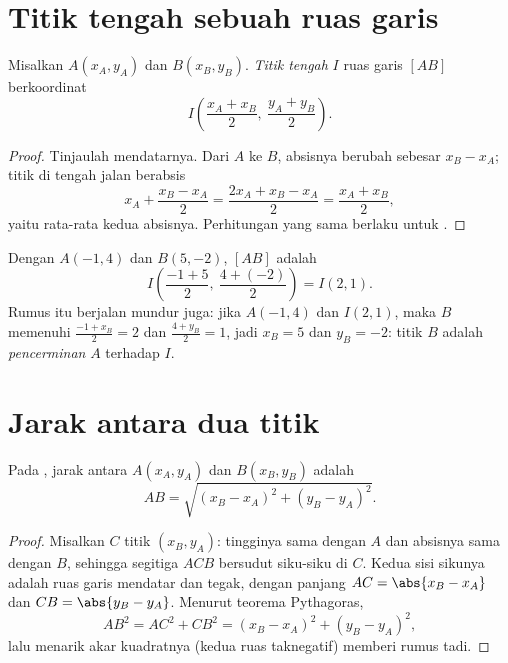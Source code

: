 \section{Titik tengah sebuah ruas garis}

\begin{proposition}\label{prop:g10:coordgeom:midpoint}
Misalkan $A(x_A, y_A)$ dan $B(x_B, y_B)$. \emph{Titik tengah}
$I$ ruas garis $[AB]$ berkoordinat
\[
I\left(\frac{x_A + x_B}{2},\ \frac{y_A + y_B}{2}\right).
\]
\end{proposition}

\begin{proof}
Tinjaulah  mendatarnya. Dari $A$ ke $B$, absisnya
berubah sebesar $x_B - x_A$; titik di tengah jalan berabsis
\[
x_A + \frac{x_B - x_A}{2} = \frac{2x_A + x_B - x_A}{2}
= \frac{x_A + x_B}{2},
\]
yaitu rata-rata kedua absisnya. Perhitungan yang sama berlaku untuk
.
\end{proof}

\begin{example}\label{ex:g10:coordgeom:midpoint}
Dengan $A(-1, 4)$ dan $B(5, -2)$,  $[AB]$ adalah
\[
I\left(\frac{-1 + 5}{2},\ \frac{4 + (-2)}{2}\right) = I(2, 1).
\]
Rumus itu berjalan mundur juga: jika $A(-1, 4)$ dan 
$I(2, 1)$, maka $B$ memenuhi $\frac{-1 + x_B}{2} = 2$ dan
$\frac{4 + y_B}{2} = 1$, jadi $x_B = 5$ dan $y_B = -2$: titik $B$ adalah
\emph{pencerminan} $A$ terhadap $I$.
\end{example}

\section{Jarak antara dua titik}

\begin{theorem}\label{thm:g10:coordgeom:distance}
Pada , jarak antara $A(x_A, y_A)$ dan
$B(x_B, y_B)$ adalah
\[
AB = \sqrt{(x_B - x_A)^2 + (y_B - y_A)^2}.
\]
\end{theorem}

\begin{proof}
Misalkan $C$ titik $(x_B, y_A)$: tingginya sama dengan $A$ dan
absisnya sama dengan $B$, sehingga segitiga $ACB$ bersudut siku-siku di $C$.
Kedua sisi sikunya adalah ruas garis mendatar dan tegak, dengan panjang
$AC = \abs{x_B - x_A}$ dan $CB = \abs{y_B - y_A}$. Menurut teorema
Pythagoras,
\[
AB^2 = AC^2 + CB^2 = (x_B - x_A)^2 + (y_B - y_A)^2,
\]
lalu menarik akar kuadratnya (kedua ruas taknegatif) memberi rumus tadi.
\end{proof}

